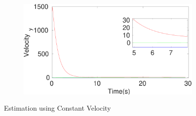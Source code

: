 \begin{figure}[h]
\begin{subfigure}{.5\linewidth}
\end{subfigure}
\begin{subfigure}{.5\linewidth}
\centering
\includegraphics[width=\linewidth]{figures/Prad/s3cvpradVelocity_y}
\end{subfigure}
\caption{Estimation using Constant Velocity}
\end{figure}

